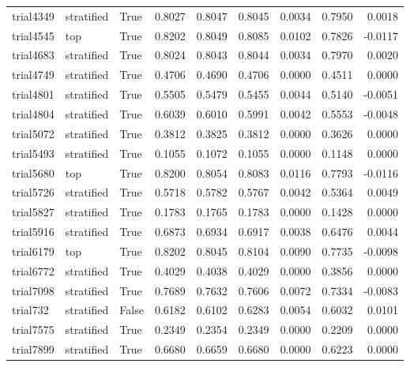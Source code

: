 \begin{tabular}{lllrrrrrr}
trial4349 & stratified &         True &  0.8027 &     0.8047 &  0.8045 &     0.0034 &   0.7950 &    0.0018 \\
trial4545 &        top &         True &  0.8202 &     0.8049 &  0.8085 &     0.0102 &   0.7826 &   -0.0117 \\
trial4683 & stratified &         True &  0.8024 &     0.8043 &  0.8044 &     0.0034 &   0.7970 &    0.0020 \\
trial4749 & stratified &         True &  0.4706 &     0.4690 &  0.4706 &     0.0000 &   0.4511 &    0.0000 \\
trial4801 & stratified &         True &  0.5505 &     0.5479 &  0.5455 &     0.0044 &   0.5140 &   -0.0051 \\
trial4804 & stratified &         True &  0.6039 &     0.6010 &  0.5991 &     0.0042 &   0.5553 &   -0.0048 \\
trial5072 & stratified &         True &  0.3812 &     0.3825 &  0.3812 &     0.0000 &   0.3626 &    0.0000 \\
trial5493 & stratified &         True &  0.1055 &     0.1072 &  0.1055 &     0.0000 &   0.1148 &    0.0000 \\
trial5680 &        top &         True &  0.8200 &     0.8054 &  0.8083 &     0.0116 &   0.7793 &   -0.0116 \\
trial5726 & stratified &         True &  0.5718 &     0.5782 &  0.5767 &     0.0042 &   0.5364 &    0.0049 \\
trial5827 & stratified &         True &  0.1783 &     0.1765 &  0.1783 &     0.0000 &   0.1428 &    0.0000 \\
trial5916 & stratified &         True &  0.6873 &     0.6934 &  0.6917 &     0.0038 &   0.6476 &    0.0044 \\
trial6179 &        top &         True &  0.8202 &     0.8045 &  0.8104 &     0.0090 &   0.7735 &   -0.0098 \\
trial6772 & stratified &         True &  0.4029 &     0.4038 &  0.4029 &     0.0000 &   0.3856 &    0.0000 \\
trial7098 & stratified &         True &  0.7689 &     0.7632 &  0.7606 &     0.0072 &   0.7334 &   -0.0083 \\
 trial732 & stratified &        False &  0.6182 &     0.6102 &  0.6283 &     0.0054 &   0.6032 &    0.0101 \\
trial7575 & stratified &         True &  0.2349 &     0.2354 &  0.2349 &     0.0000 &   0.2209 &    0.0000 \\
trial7899 & stratified &         True &  0.6680 &     0.6659 &  0.6680 &     0.0000 &   0.6223 &    0.0000 \\

\end{tabular}
